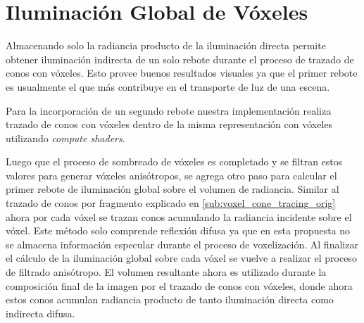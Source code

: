 \section{Iluminación Global de Vóxeles} %
\label{sec:iluminacion_global_de_voxeles}
Almacenando solo la radiancia producto de la iluminación directa permite obtener iluminación indirecta de un solo rebote durante el proceso de trazado de conos con vóxeles. Esto provee buenos resultados visuales ya que el primer rebote es usualmente el que más contribuye en el transporte de luz de una escena.

Para la incorporación de un segundo rebote nuestra implementación realiza trazado de conos con vóxeles dentro de la misma representación con vóxeles utilizando \emph{compute shaders}. 

Luego que el proceso de sombreado de vóxeles es completado y se filtran estos valores para generar vóxeles anisótropos, se agrega otro paso para calcular el primer rebote de iluminación global sobre el volumen de radiancia. Similar al trazado de conos por fragmento explicado en \ref{sub:voxel_cone_tracing_orig} ahora por cada vóxel se trazan conos acumulando la radiancia incidente sobre el vóxel. Este método solo comprende reflexión difusa ya que en esta propuesta no se almacena información especular durante el proceso de voxelización. Al finalizar el cálculo de la iluminación global sobre cada vóxel se vuelve a realizar el proceso de filtrado anisótropo. El volumen resultante ahora es utilizado durante la composición final de la imagen por el trazado de conos con vóxeles, donde ahora estos conos acumulan radiancia producto de tanto iluminación directa como indirecta difusa.
